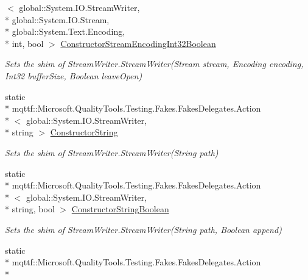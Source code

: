 \begin{DoxyCompactItemize}
$<$ global\-::\-System.\-I\-O.\-Stream\-Writer, \\*
global\-::\-System.\-I\-O.\-Stream, \\*
global\-::\-System.\-Text.\-Encoding, \\*
int, bool $>$ \hyperlink{class_system_1_1_i_o_1_1_fakes_1_1_shim_stream_writer_a17c1cdaaa0ab084e19cbb7105521d702}{Constructor\-Stream\-Encoding\-Int32\-Boolean}
\begin{DoxyCompactList}\small\item\em Sets the shim of Stream\-Writer.\-Stream\-Writer(\-Stream stream, Encoding encoding, Int32 buffer\-Size, Boolean leave\-Open)\end{DoxyCompactList}\item 
static \\*
mqttf\-::\-Microsoft.\-Quality\-Tools.\-Testing.\-Fakes.\-Fakes\-Delegates.\-Action\\*
$<$ global\-::\-System.\-I\-O.\-Stream\-Writer, \\*
string $>$ \hyperlink{class_system_1_1_i_o_1_1_fakes_1_1_shim_stream_writer_a26ba1d93e857cfa90652958ac9542d05}{Constructor\-String}
\begin{DoxyCompactList}\small\item\em Sets the shim of Stream\-Writer.\-Stream\-Writer(\-String path)\end{DoxyCompactList}\item 
static \\*
mqttf\-::\-Microsoft.\-Quality\-Tools.\-Testing.\-Fakes.\-Fakes\-Delegates.\-Action\\*
$<$ global\-::\-System.\-I\-O.\-Stream\-Writer, \\*
string, bool $>$ \hyperlink{class_system_1_1_i_o_1_1_fakes_1_1_shim_stream_writer_aae12a8fc3e5fff968b039bd1fcf32fab}{Constructor\-String\-Boolean}
\begin{DoxyCompactList}\small\item\em Sets the shim of Stream\-Writer.\-Stream\-Writer(\-String path, Boolean append)\end{DoxyCompactList}\item 
static \\*
mqttf\-::\-Microsoft.\-Quality\-Tools.\-Testing.\-Fakes.\-Fakes\-Delegates.\-Action\\*

\end{DoxyCompactItemize}
